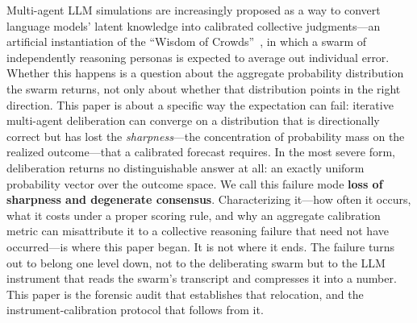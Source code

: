 \documentclass[11pt,journal,onecolumn]{IEEEtran}
\begin{document}
Multi-agent LLM simulations are increasingly proposed as a way to convert language models' latent knowledge into calibrated collective judgments---an artificial instantiation of the ``Wisdom of Crowds''~\cite{surowiecki2005}, in which a swarm of independently reasoning personas is expected to average out individual error. Whether this happens is a question about the aggregate probability distribution the swarm returns, not only about whether that distribution points in the right direction. This paper is about a specific way the expectation can fail: iterative multi-agent deliberation can converge on a distribution that is directionally correct but has lost the \emph{sharpness}---the concentration of probability mass on the realized outcome---that a calibrated forecast requires. In the most severe form, deliberation returns no distinguishable answer at all: an exactly uniform probability vector over the outcome space. We call this failure mode \textbf{loss of sharpness and degenerate consensus}. Characterizing it---how often it occurs, what it costs under a proper scoring rule, and why an aggregate calibration metric can misattribute it to a collective reasoning failure that need not have occurred---is where this paper began. It is not where it ends. The failure turns out to belong one level down, not to the deliberating swarm but to the LLM instrument that reads the swarm's transcript and compresses it into a number. This paper is the forensic audit that establishes that relocation, and the instrument-calibration protocol that follows from it.
\end{document}
